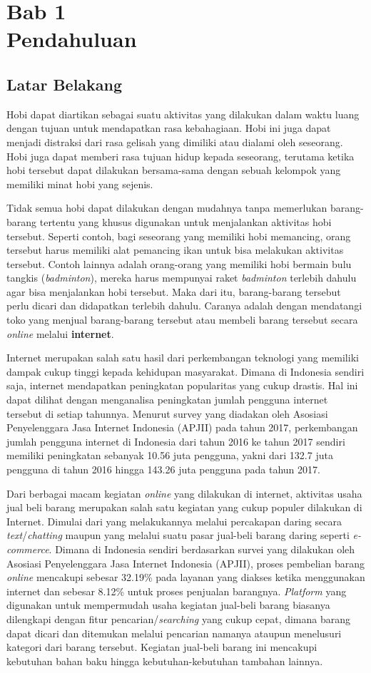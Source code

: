 \documentclass[a4paper]{article}
\newcommand{\bab}[2]{%
    \addtocounter{section}{1}%
    \setcounter{subsection}{0}
    \setcounter{subsubsection}{0}
    \setcounter{figure}{0}
    \setcounter{table}{0}
    \section*{#1\\#2}%
    \addcontentsline{toc}{section}{\protect\numberline{}#1 #2}%
}
\newcommand{\subbab}[1]{%
    \subsection{#1}%
    \setcounter{figure}{0}
    \setcounter{table}{0}
}
\begin{document}
\newpage
{}
\bab{Bab 1}{Pendahuluan}

\subbab{Latar Belakang}

Hobi dapat diartikan sebagai suatu aktivitas yang dilakukan dalam waktu luang dengan tujuan untuk mendapatkan rasa kebahagiaan. Hobi ini juga dapat menjadi distraksi dari rasa gelisah yang dimiliki atau dialami oleh seseorang. Hobi juga dapat memberi rasa tujuan hidup kepada seseorang, terutama ketika hobi tersebut dapat dilakukan bersama-sama dengan sebuah kelompok yang memiliki minat hobi yang sejenis\autocite{zaidi2022passion}.

Tidak semua hobi dapat dilakukan dengan mudahnya tanpa memerlukan barang-barang tertentu yang khusus digunakan untuk menjalankan aktivitas hobi tersebut. Seperti contoh, bagi seseorang yang memiliki hobi memancing, orang tersebut harus memiliki alat pemancing ikan untuk bisa melakukan aktivitas tersebut. Contoh lainnya adalah orang-orang yang memiliki hobi bermain bulu tangkis (\textit{badminton}), mereka harus mempunyai raket \textit{badminton} terlebih dahulu agar bisa menjalankan hobi tersebut. Maka dari itu, barang-barang tersebut perlu dicari dan didapatkan terlebih dahulu. Caranya adalah dengan mendatangi toko yang menjual barang-barang tersebut atau membeli barang tersebut secara \textit{online} melalui \textbf{internet}.

Internet merupakan salah satu hasil dari perkembangan teknologi yang memiliki dampak cukup tinggi kepada kehidupan masyarakat. Dimana di Indonesia sendiri saja, internet mendapatkan peningkatan popularitas yang cukup drastis. Hal ini dapat dilihat dengan menganalisa peningkatan jumlah pengguna internet tersebut di setiap tahunnya. Menurut survey yang diadakan oleh Asosiasi Penyelenggara Jasa Internet Indonesia (APJII) pada tahun 2017, perkembangan jumlah pengguna internet di Indonesia dari tahun 2016 ke tahun 2017 sendiri memiliki peningkatan sebanyak 10.56 juta pengguna, yakni dari 132.7 juta pengguna di tahun 2016 hingga 143.26 juta pengguna pada tahun 2017\autocite{indonesia2017infografis}.

Dari berbagai macam kegiatan \textit{online} yang dilakukan di internet, aktivitas usaha jual beli barang merupakan salah satu kegiatan yang cukup populer dilakukan di Internet. Dimulai dari yang melakukannya melalui percakapan daring secara \textit{text}/\textit{chatting} maupun yang melalui suatu pasar jual-beli barang daring seperti \textit{e-commerce}. Dimana di Indonesia sendiri berdasarkan survei yang dilakukan oleh Asosiasi Penyelenggara Jasa Internet Indonesia (APJII), proses pembelian barang \textit{online} mencakupi sebesar 32.19\% pada layanan yang diakses ketika menggunakan internet dan sebesar 8.12\% untuk proses penjualan barangnya\autocite{indonesia2017infografis}. \textit{Platform} yang digunakan untuk mempermudah usaha kegiatan jual-beli barang biasanya dilengkapi dengan fitur pencarian/\textit{searching} yang cukup cepat, dimana barang dapat dicari dan ditemukan melalui pencarian namanya ataupun menelusuri kategori dari barang tersebut. Kegiatan jual-beli barang ini mencakupi kebutuhan bahan baku hingga kebutuhan-kebutuhan tambahan lainnya.
\end{document}
